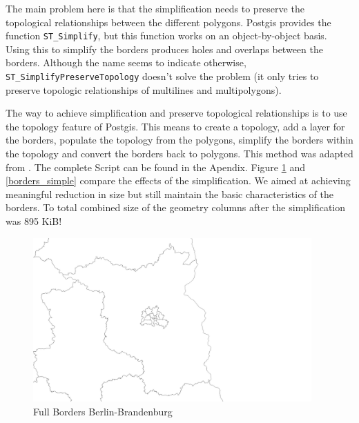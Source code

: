 \documentclass[paper=a4, fontsize=11pt]{scrartcl} %
\numberwithin{equation}{section} %
\numberwithin{figure}{section} %
\numberwithin{table}{section} %
\begin{document}
The main problem here is that the simplification needs to preserve the topological relationships between the different polygons. Postgis provides the function \lstinline{ST_Simplify}, but this function works on an object-by-object basis. Using this to simplify the borders produces holes and overlaps between the borders. Although the name seems to indicate otherwise, \lstinline{ST_SimplifyPreserveTopology} doesn't solve the problem (it only tries to preserve topologic relationships of multilines and multipolygons).

The way to achieve simplification and preserve topological relationships is to use the topology feature of Postgis. This means to create a topology, add a layer for the borders, populate the topology from the polygons, simplify the borders within the topology and convert the borders back to polygons. This method was adapted from 
	. The complete Script can be found in the Apendix. Figure \ref{borders_full} and \ref{borders_simple} compare the effects of the simplification. We aimed at achieving meaningful reduction in size but still maintain the basic characteristics of the borders. To total combined size of the geometry columns after the simplification was 895 KiB!

\begin{figure}[htbp]
	\centering
	\includegraphics[trim = 80mm 10mm 200mm 20mm, clip, width=0.95\textwidth]{pictures/borders_full}
	\caption{Full Borders Berlin-Brandenburg}
	\label{borders_full}
\end{figure}
\end{document}
